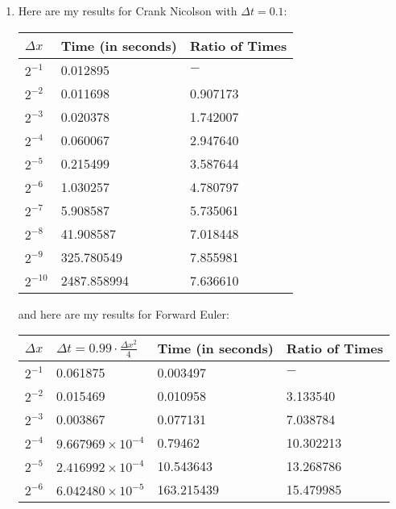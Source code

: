 \documentclass{article} %
\theoremstyle{plain}
\newcommand{\Dx}{\Delta x}
\newcommand{\Dt}{\Delta t}
\numberwithin{equation}{section} %
\numberwithin{figure}{section} %
\numberwithin{table}{section} %
\begin{document}
\begin{enumerate}[\ \ (a)]
    \item
        Here are my results for Crank Nicolson with $\Dt = 0.1$:
        \begin{table}[ht!]
            \centering
            \begin{tabular}{||l|l|l||}\hline\hline
                $\Dx$ & Time (in seconds) & Ratio of Times \\\hline\hline
                $2^{-1}$ & 0.012895 & $-$ \\\hline
                $2^{-2}$ & 0.011698 & 0.907173 \\\hline
                $2^{-3}$ & 0.020378 & 1.742007 \\\hline
                $2^{-4}$ & 0.060067 & 2.947640 \\\hline
                $2^{-5}$ & 0.215499 & 3.587644 \\\hline
                $2^{-6}$ & 1.030257 & 4.780797 \\\hline
                $2^{-7}$ & 5.908587 & 5.735061 \\\hline
                $2^{-8}$ & 41.908587 & 7.018448 \\\hline
                $2^{-9}$ & 325.780549 & 7.855981 \\\hline
                $2^{-10}$ & 2487.858994 & 7.636610 \\\hline\hline
            \end{tabular}
        \end{table}
        \FloatBarrier
        and here are my results for Forward Euler:
        \begin{table}[ht!]
            \centering
            \begin{tabular}{||l|l|l|l||}\hline\hline
                $\Dx$ & $\Dt = 0.99\cdot\frac{\Dx^2}{4} $ & Time (in seconds) & Ratio of Times \\\hline\hline
                $2^{-1}$ & 0.061875 & 0.003497 & $-$ \\\hline
                $2^{-2}$ & 0.015469 & 0.010958 & 3.133540 \\\hline
                $2^{-3}$ & 0.003867 & 0.077131 & 7.038784 \\\hline
                $2^{-4}$ & $9.667969\times10^{-4}$ & 0.79462 & 10.302213 \\\hline
                $2^{-5}$ & $2.416992\times10^{-4}$ & 10.543643 & 13.268786 \\\hline
                $2^{-6}$ & $6.042480\times10^{-5}$ & 163.215439 & 15.479985 \\\hline

\end{tabular}
\end{table}
\end{enumerate}
\end{document}
